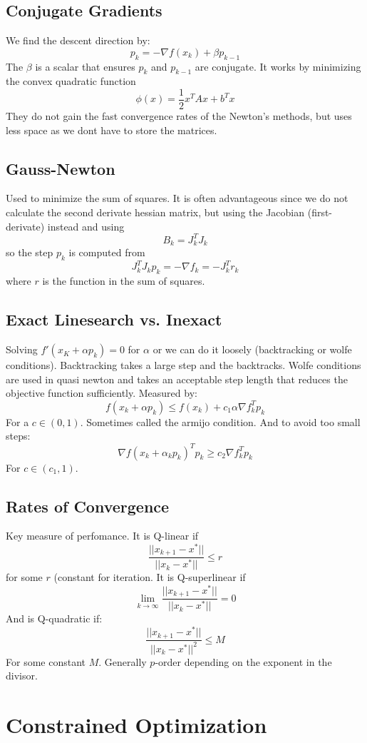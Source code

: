 \documentclass[a4paper, fleqn]{article}
\def\dpip{|\!|}
\begin{document}
\subsection{Conjugate Gradients}
We find the descent direction by:
$$
p_k=-\nabla f(x_k)+\beta p_{k-1}
$$
The $\beta$ is a scalar that ensures $p_k$ and $p_{k-1}$ are conjugate. It works by
minimizing the convex quadratic function
$$
\phi(x)=\frac{1}{2}x^TAx+b^Tx
$$
They do not gain the fast convergence rates of the Newton's methods, but uses less space
as we dont have to store the matrices.

\subsection{Gauss-Newton}
Used to minimize the sum of squares. It is often advantageous since we do not calculate
the second derivate hessian matrix, but using the Jacobian (first-derivate) instead and
using
$$
B_k=J_k^TJ_k
$$
so the step $p_k$ is computed from
$$
J_k^TJ_kp_k=-\nabla f_k=-J_k^Tr_k
$$
where $r$ is the function in the sum of squares.

\subsection{Exact Linesearch vs. Inexact}
Solving $f'(x_K+\alpha p_k)=0$ for $\alpha$ or we can do it loosely (backtracking or
wolfe conditions). Backtracking takes a large step and the backtracks. Wolfe conditions
are used in quasi newton and takes an acceptable step length that reduces the objective
function sufficiently. Measured by:
$$
f(x_k+\alpha p_k)\leq f(x_k)+c_1\alpha\nabla f_k^Tp_k
$$
For a $c\in(0,1)$. Sometimes called the armijo condition. And to avoid too small steps:
$$
\nabla f(x_k+\alpha_kp_k)^Tp_k\geq c_2\nabla f_k^Tp_k
$$
For $c\in (c_1,1)$.

\subsection{Rates of Convergence}
Key measure of perfomance. It is Q-linear if
$$
\frac{\dpip x_{k+1}-x^*\dpip}{\dpip x_k-x^*\dpip}\leq r
$$
for some $r$ (constant for iteration. It is Q-superlinear if
$$
\lim_{k\rightarrow\infty}\frac{\dpip x_{k+1}-x^*\dpip}{\dpip x_k-x^*\dpip}=0
$$
And is Q-quadratic if:
$$
\frac{\dpip x_{k+1}-x^*\dpip}{\dpip x_k-x^*\dpip^2}\leq M
$$
For some constant $M$. Generally $p$-order depending on the exponent in the divisor.

\section{Constrained Optimization}
\end{document}
